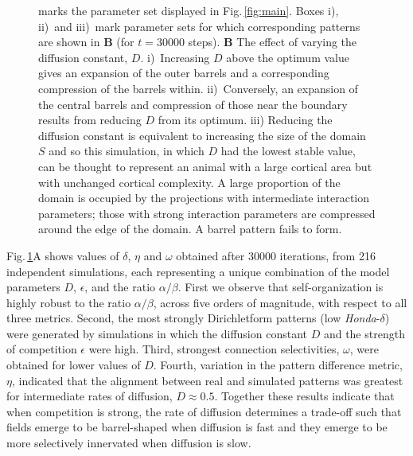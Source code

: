 \documentclass[9pt,lineno]{elife}
\newcommand{\MPthreePar}[1]{\textcolor{colmpthreepar}{#1}}
\begin{document}
\begin{figure}
\begin{fullwidth}
{{        marks the parameter set displayed in Fig.\,\ref{fig:main}. Boxes i),
        ii)~and iii)~mark parameter sets for which corresponding patterns are
        shown in \textbf{B} (for $t=30000$ steps).
%
        \textbf{B} The effect of varying the diffusion constant,
        $D$. i)~Increasing $D$ above the optimum value gives an expansion of
        the outer barrels and a corresponding compression of the barrels
        within. ii)~Conversely, an expansion of the central barrels and
        compression of those near the boundary results from reducing $D$ from
        its optimum. iii) Reducing the diffusion constant is equivalent to
        increasing the size of the domain $S$ and so this simulation, in which
        $D$ had the lowest stable value, can be thought to represent an animal
        with a large cortical area but with unchanged cortical complexity. A
        large proportion of the domain is occupied by the projections with
        intermediate interaction parameters; those with strong interaction
        parameters are compressed around the edge of the domain. A barrel
        pattern fails to form.}}
    \label{fig:paramsweep}
  \end{fullwidth}
\end{figure}

\MPthreePar{Fig.\,\ref{fig:paramsweep}A shows values of $\delta$, $\eta$ and
  $\omega$ obtained after 30000 iterations, from 216 independent simulations,
  each representing a unique combination of the model parameters $D$,
  $\epsilon$, and the ratio $\alpha/\beta$. First we observe that
  self-organization is highly robust to the ratio $\alpha/\beta$, across five
  orders of magnitude, with respect to all three metrics. Second, the most
  strongly Dirichletform patterns (low \emph{Honda}-$\delta$) were generated
  by simulations in which the diffusion constant $D$ and the strength of
  competition $\epsilon$ were high. Third, strongest connection selectivities,
  $\omega$, were obtained for lower values of $D$. Fourth, variation in the
  pattern difference metric, $\eta$, indicated that the alignment between real
  and simulated patterns was greatest for intermediate rates of diffusion,
  $D\approx0.5$. Together these results indicate that when competition is
  strong, the rate of diffusion determines a trade-off such that fields emerge
  to be barrel-shaped when diffusion is fast and they emerge to be more
  selectively innervated when diffusion is slow.}
\end{document}
